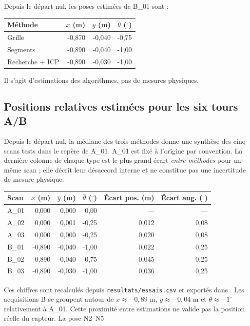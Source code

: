 \documentclass[11pt,a4paper]{article}
\begin{document}
Depuis le départ nul, les poses estimées de B\_01 sont :
\begin{center}\small
\begin{tabular}{lrrr}\toprule Méthode & $x$ (m) & $y$ (m) & $\theta$ ($^\circ$)\\
\midrule
Grille & -0,870 & -0,040 & -0,75 \\
Segments & -0,890 & -0,040 & -1,00 \\
Recherche + ICP & -0,890 & -0,030 & -1,00 \\
\bottomrule\end{tabular}
\end{center}
Il s'agit d'estimations des algorithmes, pas de mesures physiques.
\subsection{Positions relatives estimées pour les six tours A/B}
Depuis le départ nul, la médiane des trois méthodes donne une synthèse
des cinq scans tests dans le repère de A\_01. A\_01 est fixé à l'origine
par convention. La dernière colonne de chaque type est le plus grand
écart \emph{entre méthodes} pour un même scan ; elle décrit leur désaccord
interne et ne constitue pas une incertitude de mesure physique.
\begin{center}\footnotesize\setlength{\tabcolsep}{3pt}
\begin{tabular}{lrrrrr}\toprule
Scan & $\hat x$ (m) & $\hat y$ (m) & $\hat\theta$ ($^\circ$) &
Écart pos. (m) & Écart ang. ($^\circ$)\\\midrule
A\_01 & 0,000 & 0,000 & 0,00 & --- & --- \\
A\_02 & 0,000 & 0,001 & -0,25 & 0,012 & 0,08 \\
A\_03 & 0,000 & 0,000 & -0,25 & 0,020 & 0,08 \\
B\_01 & -0,890 & -0,040 & -1,00 & 0,022 & 0,25 \\
B\_02 & -0,890 & -0,040 & -0,75 & 0,045 & 0,25 \\
B\_03 & -0,890 & -0,030 & -1,00 & 0,036 & 0,25 \\
\bottomrule\end{tabular}
\end{center}
Ces chiffres sont recalculés depuis \texttt{resultats/essais.csv} et
exportés dans . Les acquisitions
B se groupent autour de $x\approx-0{,}89$ m, $y\approx-0{,}04$ m et
$\theta\approx-1^\circ$ relativement à A\_01. Cette proximité entre
estimations ne valide pas la position réelle du capteur. La pose N2--N5
\end{document}
